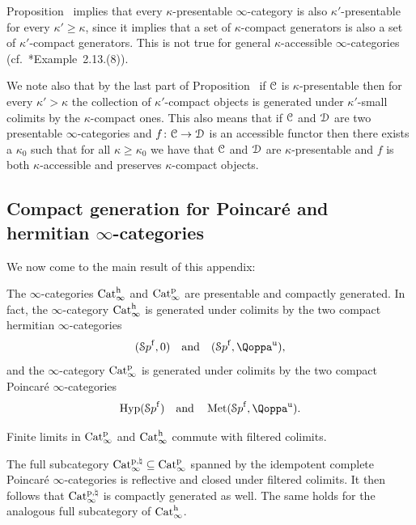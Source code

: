 \begin{remark}
\label{remark:sufficiently-large}%
Proposition~ implies that every $\kappa$-presentable $\infty$-category is also $\kappa'$-presentable for every $\kappa'\ge \kappa$, since it implies that a set of $\kappa$-compact generators is also a set of $\kappa'$-compact generators. 
This is not true for general $\kappa$-accessible $\infty$-categories (cf.\ \cite{Adamek-Rosicky}*{Example~2.13.(8)}). 

We note also that by the last part of Proposition~ if $\mathcal C$ is $\kappa$-presentable then for every $\kappa' > \kappa$ the collection of $\kappa'$-compact objects is generated under $\kappa'$-small colimits by the $\kappa$-compact ones. %
This also means that if $\mathcal C$ and $\mathcal{D}$ are two presentable $\infty$-categories and $f\colon \mathcal C \to \mathcal{D}$ is an accessible functor then there exists a $\kappa_0$ such that for all $\kappa \geq \kappa_0$ we have that $\mathcal C$ and $\mathcal{D}$ are $\kappa$-presentable and $f$ is both $\kappa$-accessible and preserves $\kappa$-compact objects. %
\end{remark}



\subsection{Compact generation for Poincaré and hermitian $\infty$-categories}
\label{subsec:compact-gen}%


We now come to the main result of this appendix:
\begin{proposition}
\label{proposition:catp-cath-are-compact}%
The $\infty$-categories $\mathrm{Cat}^\mathrm{h}_\infty$ and $\mathrm{Cat}^{\mathrm p}_\infty$ are presentable and compactly generated. In fact,
the $\infty$-category $\mathrm{Cat}^\mathrm{h}_\infty$ is generated under colimits by the two compact hermitian $\infty$-categories
\[
(\Spaf,0) \quad\text{and}\quad(\Spaf,\QF^{\uni}),
\]
and the $\infty$-category $\mathrm{Cat}^{\mathrm p}_\infty$ is generated under colimits by the two compact Poincaré $\infty$-categories
\[
\Hyp(\Spaf)  \quad \text{and} \quad \Met(\Spaf,\QF^{\uni}).
\]
\end{proposition}


\begin{corollary}
Finite limits in $\mathrm{Cat}^{\mathrm p}_\infty$ and $\mathrm{Cat}^\mathrm{h}_\infty$ commute with filtered colimits. 
\end{corollary}

\begin{remark}
The full subcategory $\mathrm{Cat}^{\mathrm p,\natural}_{\infty} \subseteq \mathrm{Cat}^{\mathrm p}_\infty$ spanned by the idempotent complete Poincaré $\infty$-categories is reflective and closed under filtered colimits. It then follows that $\mathrm{Cat}^{\mathrm p,\natural}_{\infty}$ is compactly generated as well. The same holds for the analogous full subcategory of $\mathrm{Cat}^\mathrm{h}_\infty$.
\end{remark}

